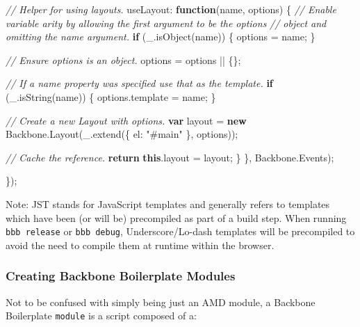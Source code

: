 \documentclass[9pt]{book}
\newenvironment{Shaded}{}{}
\newcommand{\KeywordTok}[1]{\textcolor[rgb]{0.00,0.44,0.13}{\textbf{{#1}}}}
\newcommand{\DataTypeTok}[1]{\textcolor[rgb]{0.56,0.13,0.00}{{#1}}}
\newcommand{\StringTok}[1]{\textcolor[rgb]{0.25,0.44,0.63}{{#1}}}
\newcommand{\CommentTok}[1]{\textcolor[rgb]{0.38,0.63,0.69}{\textit{{#1}}}}
\newcommand{\OtherTok}[1]{\textcolor[rgb]{0.00,0.44,0.13}{{#1}}}
\newcommand{\FunctionTok}[1]{\textcolor[rgb]{0.02,0.16,0.49}{{#1}}}
\newcommand{\NormalTok}[1]{{#1}}
\begin{document}
\begin{Shaded}
\begin{Highlighting}[]
    \CommentTok{// Helper for using layouts.}
    \DataTypeTok{useLayout}\NormalTok{: }\KeywordTok{function}\NormalTok{(name, options) \{}
      \CommentTok{// Enable variable arity by allowing the first argument to be the options}
      \CommentTok{// object and omitting the name argument.}
      \KeywordTok{if} \NormalTok{(}\OtherTok{_}\NormalTok{.}\FunctionTok{isObject}\NormalTok{(name)) \{}
        \NormalTok{options = name;}
      \NormalTok{\}}

      \CommentTok{// Ensure options is an object.}
      \NormalTok{options = options || \{\};}

      \CommentTok{// If a name property was specified use that as the template.}
      \KeywordTok{if} \NormalTok{(}\OtherTok{_}\NormalTok{.}\FunctionTok{isString}\NormalTok{(name)) \{}
        \OtherTok{options}\NormalTok{.}\FunctionTok{template} \NormalTok{= name;}
      \NormalTok{\}}

      \CommentTok{// Create a new Layout with options.}
      \KeywordTok{var} \NormalTok{layout = }\KeywordTok{new} \OtherTok{Backbone}\NormalTok{.}\FunctionTok{Layout}\NormalTok{(}\OtherTok{_}\NormalTok{.}\FunctionTok{extend}\NormalTok{(\{}
        \DataTypeTok{el}\NormalTok{: }\StringTok{"#main"}
      \NormalTok{\}, options));}

      \CommentTok{// Cache the reference.}
      \KeywordTok{return} \KeywordTok{this}\NormalTok{.}\FunctionTok{layout} \NormalTok{= layout;}
    \NormalTok{\}}
  \NormalTok{\}, }\OtherTok{Backbone}\NormalTok{.}\FunctionTok{Events}\NormalTok{);}

\NormalTok{\});}
\end{Highlighting}
\end{Shaded}

Note: JST stands for JavaScript templates and generally refers to
templates which have been (or will be) precompiled as part of a build
step. When running \texttt{bbb release} or \texttt{bbb debug},
Underscore/Lo-dash templates will be precompiled to avoid the need to
compile them at runtime within the browser.

\subsubsection{Creating Backbone Boilerplate
Modules}\label{creating-backbone-boilerplate-modules}

Not to be confused with simply being just an AMD module, a Backbone
Boilerplate \texttt{module} is a script composed of a:
\end{document}
